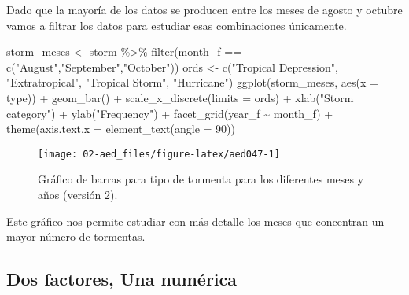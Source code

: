 \documentclass[
]{book}
\newenvironment{Shaded}{\begin{snugshade}}{\end{snugshade}}
\newcommand{\AttributeTok}[1]{\textcolor[rgb]{0.77,0.63,0.00}{#1}}
\newcommand{\DecValTok}[1]{\textcolor[rgb]{0.00,0.00,0.81}{#1}}
\newcommand{\FunctionTok}[1]{\textcolor[rgb]{0.00,0.00,0.00}{#1}}
\newcommand{\NormalTok}[1]{#1}
\newcommand{\OtherTok}[1]{\textcolor[rgb]{0.56,0.35,0.01}{#1}}
\newcommand{\SpecialCharTok}[1]{\textcolor[rgb]{0.00,0.00,0.00}{#1}}
\newcommand{\StringTok}[1]{\textcolor[rgb]{0.31,0.60,0.02}{#1}}
\begin{document}
Dado que la mayoría de los datos se producen entre los meses de agosto y octubre vamos a filtrar los datos para estudiar esas combinaciones únicamente.

\begin{Shaded}
\begin{Highlighting}[]
\NormalTok{storm\_meses }\OtherTok{\textless{}{-}}\NormalTok{ storm }\SpecialCharTok{\%\textgreater{}\%}
  \FunctionTok{filter}\NormalTok{(month\_f }\SpecialCharTok{==} \FunctionTok{c}\NormalTok{(}\StringTok{"August"}\NormalTok{,}\StringTok{"September"}\NormalTok{,}\StringTok{"October"}\NormalTok{))}
\NormalTok{ords }\OtherTok{\textless{}{-}} \FunctionTok{c}\NormalTok{(}\StringTok{"Tropical Depression"}\NormalTok{, }\StringTok{"Extratropical"}\NormalTok{, }\StringTok{"Tropical Storm"}\NormalTok{, }\StringTok{"Hurricane"}\NormalTok{)}
\FunctionTok{ggplot}\NormalTok{(storm\_meses, }\FunctionTok{aes}\NormalTok{(}\AttributeTok{x =}\NormalTok{ type))  }\SpecialCharTok{+}
  \FunctionTok{geom\_bar}\NormalTok{() }\SpecialCharTok{+} 
  \FunctionTok{scale\_x\_discrete}\NormalTok{(}\AttributeTok{limits =}\NormalTok{ ords) }\SpecialCharTok{+}
  \FunctionTok{xlab}\NormalTok{(}\StringTok{"Storm category"}\NormalTok{) }\SpecialCharTok{+}
  \FunctionTok{ylab}\NormalTok{(}\StringTok{"Frequency"}\NormalTok{) }\SpecialCharTok{+}
  \FunctionTok{facet\_grid}\NormalTok{(year\_f }\SpecialCharTok{\textasciitilde{}}\NormalTok{ month\_f) }\SpecialCharTok{+}
  \FunctionTok{theme}\NormalTok{(}\AttributeTok{axis.text.x =} \FunctionTok{element\_text}\NormalTok{(}\AttributeTok{angle =} \DecValTok{90}\NormalTok{)) }
\end{Highlighting}
\end{Shaded}

\begin{figure}

{\centering \texttt{[image: 02-aed\_files/figure-latex/aed047-1]} 

}

\caption{Gráfico de barras para tipo de tormenta para los diferentes meses y años (versión 2).}\label{fig:aed047}
\end{figure}

Este gráfico nos permite estudiar con más detalle los meses que concentran un mayor número de tormentas.

\hypertarget{dos-factores-una-numuxe9rica}{%
\subsection{Dos factores, Una numérica}\label{dos-factores-una-numuxe9rica}}
\end{document}
